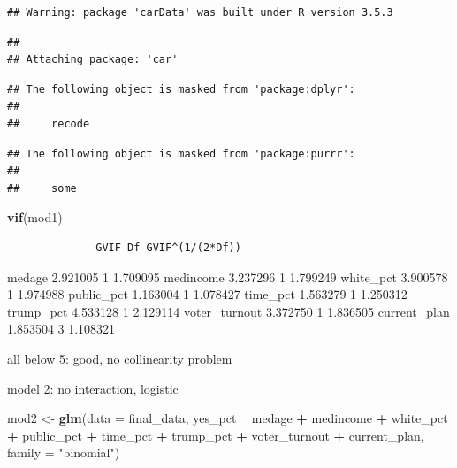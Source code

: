\documentclass[
]{article}
\newenvironment{Shaded}{\begin{snugshade}}{\end{snugshade}}
\newcommand{\DataTypeTok}[1]{\textcolor[rgb]{0.13,0.29,0.53}{#1}}
\newcommand{\KeywordTok}[1]{\textcolor[rgb]{0.13,0.29,0.53}{\textbf{#1}}}
\newcommand{\NormalTok}[1]{#1}
\newcommand{\OperatorTok}[1]{\textcolor[rgb]{0.81,0.36,0.00}{\textbf{#1}}}
\newcommand{\StringTok}[1]{\textcolor[rgb]{0.31,0.60,0.02}{#1}}
\begin{document}
\begin{verbatim}
## Warning: package 'carData' was built under R version 3.5.3
\end{verbatim}

\begin{verbatim}
## 
## Attaching package: 'car'
\end{verbatim}

\begin{verbatim}
## The following object is masked from 'package:dplyr':
## 
##     recode
\end{verbatim}

\begin{verbatim}
## The following object is masked from 'package:purrr':
## 
##     some
\end{verbatim}

\begin{Shaded}
\begin{Highlighting}[]
\KeywordTok{vif}\NormalTok{(mod1)}
\end{Highlighting}
\end{Shaded}

\begin{verbatim}
              GVIF Df GVIF^(1/(2*Df))
\end{verbatim}

medage 2.921005 1 1.709095 medincome 3.237296 1 1.799249 white\_pct
3.900578 1 1.974988 public\_pct 1.163004 1 1.078427 time\_pct 1.563279 1
1.250312 trump\_pct 4.533128 1 2.129114 voter\_turnout 3.372750 1
1.836505 current\_plan 1.853504 3 1.108321

all below 5: good, no collinearity problem

model 2: no interaction, logistic

\begin{Shaded}
\begin{Highlighting}[]
\NormalTok{mod2 <-}\StringTok{ }\KeywordTok{glm}\NormalTok{(}\DataTypeTok{data =}\NormalTok{ final_data, yes_pct }\OperatorTok{~}\StringTok{ }\NormalTok{medage }\OperatorTok{+}\StringTok{ }\NormalTok{medincome }\OperatorTok{+}\StringTok{ }\NormalTok{white_pct }\OperatorTok{+}\StringTok{ }\NormalTok{public_pct }\OperatorTok{+}\StringTok{ }\NormalTok{time_pct }\OperatorTok{+}\StringTok{ }\NormalTok{trump_pct }\OperatorTok{+}\StringTok{ }\NormalTok{voter_turnout }\OperatorTok{+}\StringTok{ }\NormalTok{current_plan, }\DataTypeTok{family =} \StringTok{"binomial"}\NormalTok{)}
\end{Highlighting}
\end{Shaded}
\end{document}
